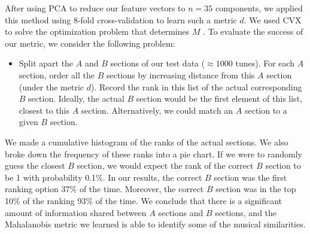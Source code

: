 \documentclass{article} %
\begin{document}
After using PCA to reduce our feature vectors to $n = 35$ components, we applied
this method using 8-fold cross-validation to learn such a metric $d$. We used
CVX to solve the optimization problem that determines $M$ \cite{cvx}.
To evaluate the success of our metric, we consider the following problem:
\begin{itemize}
\item[] Split apart the $A$ and $B$ sections of our test data ($\approx 1000$
tunes). For each $A$ section, order all the $B$ sections by increasing distance
from this $A$ section (under the metric $d$). Record the rank in this list of
the actual corresponding $B$ section. Ideally, the actual $B$ section would be
the first element of this list, closest to this $A$ section. Alternatively, we
could match an $A$ section to a given $B$ section.
\end{itemize}
We made a cumulative histogram of the ranks of the actual sections.%
We also broke down the frequency of these ranks into a pie chart. %
If we were to randomly guess the closest $B$ section, we would expect the rank
of the correct $B$ section to be 1 with probability 0.1\%. In our results, the
correct $B$ section was the first ranking option 37\% of the time. Moreover, the
correct $B$ section was in the top 10\% of the ranking 93\% of the time. We
conclude that there is a significant amount of information shared between $A$
sections and $B$ sections, and the Mahalanobis metric we learned is able to
identify some of the musical similarities.
\end{document}
